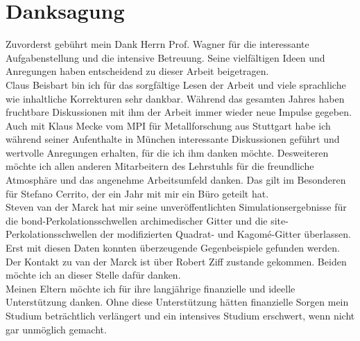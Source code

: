 

\chapter*{Danksagung}

Zuvorderst geb\"uhrt mein Dank Herrn Prof. Wagner f\"ur die interessante Aufgabenstellung und die intensive Betreuung. Seine vielf\"altigen Ideen und Anregungen haben entscheidend zu dieser Arbeit beigetragen.   
\\Claus Beisbart bin ich f\"ur das sorgf\"altige Lesen der Arbeit und viele sprachliche wie inhaltliche Korrekturen sehr dankbar. W\"ahrend das gesamten Jahres haben fruchtbare Diskussionen mit ihm der Arbeit immer wieder neue Impulse gegeben. Auch mit Klaus Mecke vom MPI f\"ur Metallforschung aus Stuttgart habe ich w\"ahrend seiner Aufenthalte in M\"unchen interessante Diskussionen gef\"uhrt und wertvolle Anregungen erhalten, f\"ur die ich ihm danken m\"ochte. 
Desweiteren m\"ochte ich allen anderen Mitarbeitern des Lehrstuhls f\"ur die freundliche Atmosph\"are und das angenehme Arbeitsumfeld danken. Das gilt im Besonderen f\"ur Stefano Cerrito, der ein Jahr mit mir ein B\"uro geteilt hat.
\\Steven van der Marck hat mir seine unver\"offentlichten Simulationsergebnisse f\"ur die bond-Perkolationsschwellen archimedischer Gitter und die site-Perkolationsschwellen der modifizierten Quadrat- und Kagom\'e-Gitter \"uberlassen. Erst mit diesen Daten konnten \"uberzeugende Gegenbeispiele gefunden werden. Der Kontakt zu van der Marck ist \"uber Robert Ziff zustande gekommen. Beiden m\"ochte ich an dieser Stelle daf\"ur danken.   
\\Meinen Eltern m\"ochte ich f\"ur ihre langj\"ahrige finanzielle und ideelle Unterst\"utzung danken. Ohne diese Unterst\"utzung h\"atten finanzielle Sorgen mein Studium betr\"achtlich verl\"angert und ein intensives Studium erschwert, wenn nicht gar unm\"oglich gemacht.    
